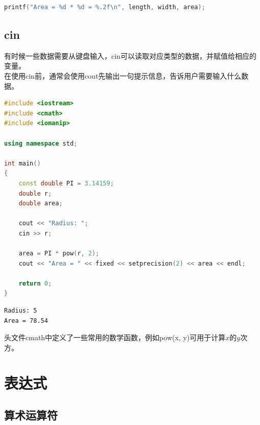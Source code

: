 \vspace{-0.5cm}

\begin{lstlisting}[language=C]
printf("Area = %d * %d = %.2f\n", length, width, area);
\end{lstlisting}

\vspace{0.5cm}

\subsection{cin}

有时候一些数据需要从键盘输入，cin可以读取对应类型的数据，并赋值给相应的变量。\\

在使用cin前，通常会使用cout先输出一句提示信息，告诉用户需要输入什么数据。\\


\begin{lstlisting}[language=C++]
#include <iostream>
#include <cmath>
#include <iomanip>

using namespace std;

int main()
{
	const double PI = 3.14159;
	double r;
	double area;

	cout << "Radius: ";
	cin >> r;

	area = PI * pow(r, 2);
	cout << "Area = " << fixed << setprecision(2) << area << endl;
	
	return 0;
}
\end{lstlisting}

\begin{tcolorbox}
	\begin{verbatim}
Radius: 5
Area = 78.54
	\end{verbatim}
\end{tcolorbox}

头文件cmath中定义了一些常用的数学函数，例如pow(x, y)可用于计算$ x $的$ y $次方。\\

\newpage

\section{表达式}

\subsection{算术运算符}

